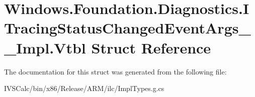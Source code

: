 \hypertarget{struct_windows_1_1_foundation_1_1_diagnostics_1_1_i_tracing_status_changed_event_args_____impl_1_1_vtbl}{}\section{Windows.\+Foundation.\+Diagnostics.\+I\+Tracing\+Status\+Changed\+Event\+Args\+\_\+\+\_\+\+Impl.\+Vtbl Struct Reference}
\label{struct_windows_1_1_foundation_1_1_diagnostics_1_1_i_tracing_status_changed_event_args_____impl_1_1_vtbl}


The documentation for this struct was generated from the following file\+:\begin{DoxyCompactItemize}
\item 
I\+V\+S\+Calc/bin/x86/\+Release/\+A\+R\+M/ilc/Impl\+Types.\+g.\+cs\end{DoxyCompactItemize}
